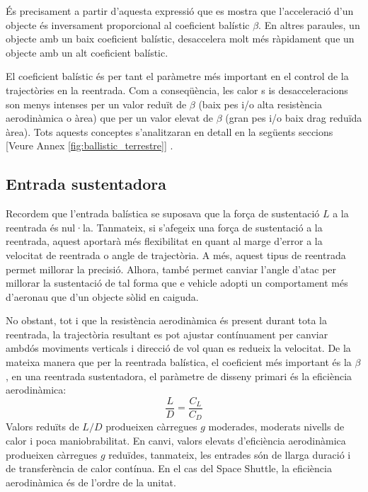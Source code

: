 És precisament a partir d'aquesta expressió que es mostra que l'acceleració d'un objecte és inversament proporcional  al coeficient balístic $\beta$. En altres paraules, un objecte amb un baix coeficient balístic, desaccelera molt més ràpidament que un objecte amb un alt coeficient balístic.

El coeficient balístic és per tant el paràmetre més important en el control de la trajectòries en la reentrada. Com a conseqüència, les calor s is desacceleracions son menys intenses per un valor reduït de $\beta$ (baix pes i/o alta resistència aerodinàmica o àrea) que per un valor elevat de $\beta$ (gran pes i/o baix drag reduïda àrea). Tots aquests conceptes s'analitzaran en detall en la següents seccions [Veure Annex \ref{fig:ballistic_terrestre}] \cite{nasa_ballistic} \cite{nasa_vol_drag}.

\newpage
\subsection{Entrada sustentadora}
Recordem que l'entrada balística se suposava que la força de sustentació $L$ a la reentrada és nul·la. Tanmateix, si s'afegeix una força de sustentació a la reentrada, aquest aportarà més flexibilitat en quant al marge d'error a la velocitat de reentrada o angle de trajectòria. A més, aquest tipus de reentrada permet millorar la precisió. Alhora, també permet canviar l'angle d'atac per millorar la sustentació de tal forma que e vehicle adopti un comportament més d'aeronau que d'un objecte sòlid en caiguda.

No obstant, tot i que la resistència aerodinàmica és present durant tota la reentrada, la trajectòria resultant es pot ajustar contínuament per canviar ambdós moviments verticals i direcció de vol quan es redueix la velocitat. De la mateixa manera que per la reentrada balística, el coeficient més important és la $\beta$, en una reentrada sustentadora, el paràmetre de disseny primari és la eficiència aerodinàmica:
\begin{equation}
    \frac{L}{D} = \frac{C_L}{C_D}
\end{equation}
Valors reduïts de $L/D$ produeixen càrregues $g$ moderades, moderats nivells de calor i poca maniobrabilitat. En canvi, valors elevats d'eficiència aerodinàmica produeixen càrregues $g$ reduïdes, tanmateix, les entrades són de llarga duració i de transferència de calor contínua. En el cas del Space Shuttle, la eficiència aerodinàmica és de l'ordre de la unitat.

